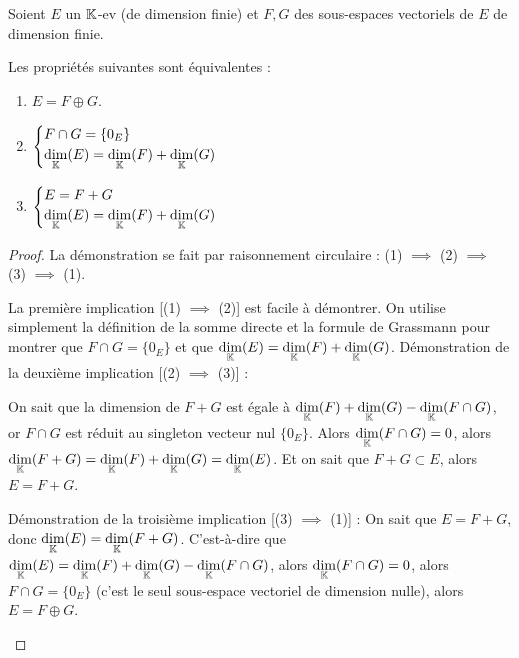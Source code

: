 \documentclass[12pt, a4paper]{report}
\begin{document}
\begin{consequence}
    Soient $E$ un $\mathbb{K}$-ev (de dimension finie) et $F,G$ des sous-espaces vectoriels de $E$ de dimension finie.

    Les propriétés suivantes sont équivalentes :

    \begin{enumerate}
        \item $E = F \oplus G$.
        \item $\displaystyle\begin{cases}
        F\cap G = \{0_E\}\\
        \underset{\mathbb{K}}\dim(E) = \underset{\mathbb{K}}\dim(F) + \underset{\mathbb{K}}\dim(G)
        \end{cases}$
        \item $\displaystyle\begin{cases} E = F + G \\ \underset{\mathbb{K}}\dim(E) = \underset{\mathbb{K}}\dim(F) + \underset{\mathbb{K}}\dim(G)\end{cases}$
    \end{enumerate}

    \label{conseq:carac_somme_directe}
\end{consequence}

\begin{proof}
    La démonstration se fait par raisonnement circulaire : (1) $\implies$ (2) $\implies$ (3) $\implies$ (1).

    \begin{outline}
        \1 La première implication [(1) $\implies$ (2)] est facile à démontrer. On utilise simplement la définition de la somme directe et la formule de Grassmann pour montrer que $F\cap G = \{0_E\}$ et que $\underset{\mathbb{K}}\dim(E) = \underset{\mathbb{K}}\dim(F) + \underset{\mathbb{K}}\dim(G)$.
        \1 Démonstration de la deuxième implication [(2) $\implies$ (3)] :
        
            \2 On sait que la dimension de $F+G$ est égale à $\underset{\mathbb{K}}\dim(F) + \underset{\mathbb{K}}\dim(G) - \underset{\mathbb{K}}\dim(F \cap G)$, or $F \cap G$ est réduit au singleton vecteur nul $\{0_E\}$.
            \2 Alors $\underset{\mathbb{K}}\dim(F \cap G) = 0$, alors $\underset{\mathbb{K}}\dim(F+G) = \underset{\mathbb{K}}\dim(F) + \underset{\mathbb{K}}\dim(G) = \underset{\mathbb{K}}\dim(E)$.
            \2 Et on sait que $F + G \subset E$, alors $E = F + G$.

        \1 Démonstration de la troisième implication [(3) $\implies$ (1)] :
            \2 On sait que $E = F+G$, donc $\underset{\mathbb{K}}\dim(E) = \underset{\mathbb{K}}\dim(F+G)$.
            \2 C'est-à-dire que $\underset{\mathbb{K}}\dim(E) = \underset{\mathbb{K}}\dim(F) + \underset{\mathbb{K}}\dim(G) - \underset{\mathbb{K}}\dim(F \cap G)$, alors $\underset{\mathbb{K}}\dim(F \cap G) = 0$, alors $F \cap G = \{0_E\}$ (c'est le seul sous-espace vectoriel de dimension nulle), alors $E = F \oplus G$.
    \end{outline}
\end{proof}
\end{document}
